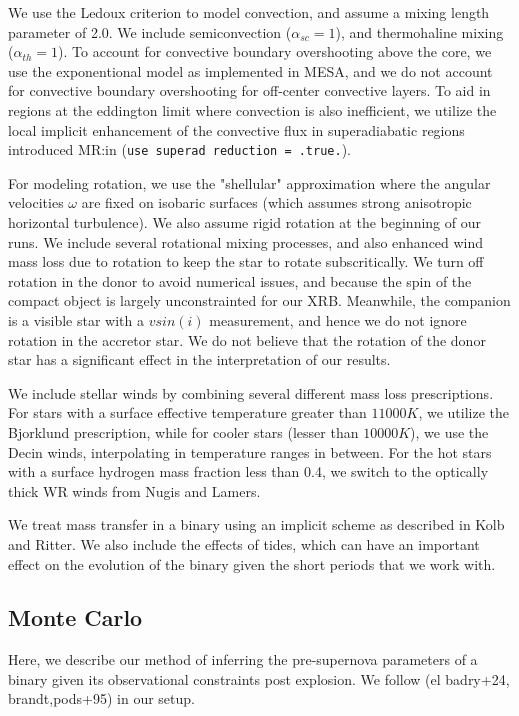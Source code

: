 \documentclass[linenumbers,trackchanges,twocolumn]{aastex701}
\newcommand{\mr}[1]{\textcolor{green!80!black}{MR:#1}}
\begin{document}
We use the Ledoux criterion to model convection, and assume a mixing length parameter of 2.0. We include semiconvection ($\alpha_{sc}=1$), and thermohaline mixing ($\alpha_{th}=1$). To account for convective boundary overshooting above the core, we use the exponentional model as implemented in MESA, and we do not account for convective boundary overshooting for off-center convective layers. To aid in regions at the eddington limit where convection is also inefficient, we utilize the local implicit enhancement of the convective flux in superadiabatic regions introduced \mr{in \cite{jermyn:23}}%
(\texttt{use superad reduction = .true.}).

For modeling rotation, we use the "shellular" approximation where the angular velocities $\omega$ are fixed on isobaric surfaces (which assumes strong anisotropic horizontal turbulence). We also assume rigid rotation at the beginning of our runs. We include several rotational mixing processes, and also enhanced wind mass loss due to rotation to keep the star to rotate subscritically. We turn off rotation in the donor to avoid numerical issues, and because the spin of the compact object is largely unconstrainted for our XRB. Meanwhile, the companion is a visible star with a $vsin(i)$ measurement, and hence we do not ignore rotation in the accretor star. We do not believe that the rotation of the donor star has a significant effect in the interpretation of our results.

We include stellar winds by combining several different mass loss prescriptions. For stars with a surface effective temperature greater than $11000K$, we utilize the Bjorklund prescription, while for cooler stars (lesser than $10000K$), we use the Decin winds, interpolating in temperature ranges in between. For the hot stars with a surface hydrogen mass fraction less than 0.4, we switch to the optically thick WR winds from Nugis and Lamers.

We treat mass transfer in a binary using an implicit scheme as described in Kolb and Ritter. We also include the effects of tides, which can have an important effect on the evolution of the binary given the short periods that we work with.

\subsection{Monte Carlo}

Here, we describe our method of inferring the pre-supernova parameters of a binary given its observational constraints post explosion. We follow (el badry+24, brandt,pods+95) in our setup.
\end{document}
